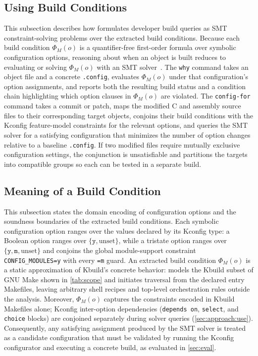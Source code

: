 \documentclass[acmsmall,screen,review,anonymous,nonacm]{acmart}
\begin{document}
  \subsection{Using Build Conditions}\label{sec:approach:use}
  This subsection describes how \tool{} formulates developer build queries as SMT constraint-solving problems over the extracted build conditions.
  Because each build condition $\Phi_M(o)$ is a quantifier-free first-order formula over symbolic configuration options, reasoning about when an object is built reduces to evaluating or solving $\Phi_M(o)$ with an SMT solver~\cite{nguyen2020kbuild}.
  The \texttt{why} command takes an object file and a concrete \texttt{.config}, evaluates $\Phi_M(o)$ under that configuration's option assignments, and reports both the resulting build status and a condition chain highlighting which option clauses in $\Phi_M(o)$ are violated.
  The \texttt{config-for} command takes a commit or patch, maps the modified C and assembly source files to their corresponding target objects, conjoins their build conditions with the Kconfig feature-model constraints for the relevant options, and queries the SMT solver for a satisfying configuration that minimizes the number of option changes relative to a baseline \texttt{.config}.
  If two modified files require mutually exclusive configuration settings, the conjunction is unsatisfiable and \tool{} partitions the targets into compatible groups so each can be tested in a separate build.

  \subsection{Meaning of a Build Condition}\label{sec:approach:meaning}
  This subsection states the domain encoding of configuration options and the soundness boundaries of the extracted build conditions.
  Each symbolic configuration option ranges over the values declared by its Kconfig type: a Boolean option ranges over $\{\texttt{y}, \text{unset}\}$, while a tristate option ranges over $\{\texttt{y}, \texttt{m}, \text{unset}\}$ and conjoins the global module-support constraint \texttt{CONFIG\_MODULES=y} with every \texttt{=m} guard.
  An extracted build condition $\Phi_M(o)$ is a static approximation of Kbuild's concrete behavior: \tool{} models the Kbuild subset of GNU Make shown in \autoref{tab:scope} and initiates traversal from the declared entry Makefiles, leaving arbitrary shell recipes and top-level orchestration rules outside the analysis.
  Moreover, $\Phi_M(o)$ captures the constraints encoded in Kbuild Makefiles alone; Kconfig inter-option dependencies (\texttt{depends on}, \texttt{select}, and \texttt{choice} blocks) are conjoined separately during solver queries (\autoref{sec:approach:use}).
  Consequently, any satisfying assignment produced by the SMT solver is treated as a candidate configuration that must be validated by running the Kconfig configurator and executing a concrete build, as evaluated in \autoref{sec:eval}.
\end{document}
